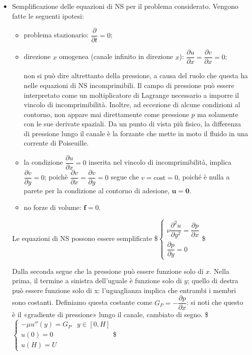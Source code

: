 \documentclass[letterpaper,10pt,italian]{jupyterBook}
\begin{document}
\begin{itemize}
\begin{itemize}
\end{itemize}

\item {} 
\sphinxAtStartPar
Semplificazione delle equazioni di NS per il problema considerato.
Vengono fatte le seguenti ipotesi:
\begin{itemize}
\item {} 
\sphinxAtStartPar
problema stazionario: \(\dfrac{\partial}{\partial t} = 0\);

\item {} 
\sphinxAtStartPar
direzione \(x\) omogenea (canale infinito in direzione \(x\)):
\(\dfrac{\partial u}{\partial x} = \dfrac{\partial v}{\partial x} = 0\);

\sphinxAtStartPar
non si può dire altrettanto della pressione, a causa del ruolo
che questa ha nelle equazioni di NS incomprimibili. Il campo di
pressione può essere interpretato come un moltiplicatore di
Lagrange necessario a imporre il vincolo di incomprimibilità.
Inoltre, ad eccezione di alcune condizioni al contorno, non
appare mai direttamente come pressione \(p\) ma solamente con le
sue derivate spaziali. Da un punto di vista più fisico, la
differenza di pressione lungo il canale è la forzante che mette
in moto il fluido in una corrente di Poiseuille.

\item {} 
\sphinxAtStartPar
la condizione \(\dfrac{\partial u}{\partial x} = 0\) inserita nel
vincolo di incomprimibilità, implica
\(\dfrac{\partial v}{\partial y}=0\); poichè
\(\dfrac{\partial v}{\partial x}=\dfrac{\partial v}{\partial y}=0\)
segue che \(v = \text{cost} = 0\), poiché è nulla a parete per la
condizione al contorno di adesione, \(\bm{u} = \bm{0}\).

\item {} 
\sphinxAtStartPar
no forze di volume: \(\bm{f} = 0\).

\end{itemize}

\sphinxAtStartPar
Le equazioni di NS possono essere semplificate \$\(\begin{cases}
  \nu \dfrac{\partial^2 u}{\partial y^2} = \dfrac{\partial p}{\partial x} \\
  \dfrac{\partial p}{\partial y} = 0  
\end{cases}\)\$

\sphinxAtStartPar
Dalla seconda segue che la pressione può essere funzione solo di
\(x\). Nella prima, il termine a sinistra dell’uguale è funzione solo
di \(y\); quello di destra può essere funzione solo di x:
l’uguaglianza implica che entrambi i membri sono costanti. Definiamo
questa costante come \(G_P = - \dfrac{\partial p}{\partial x}\): si
noti che questo è il «gradiente di pressione» lungo il canale,
cambiato di segno. \$\(\begin{cases}
    - \mu u''(y) = G_P & y \in[0,H] \\
    u(0) = 0  \\ u(H) = U
  \end{cases}\)\$


\end{itemize}
\end{document}
